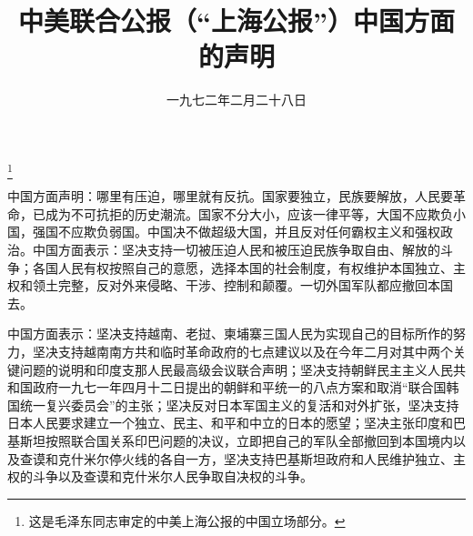 
\title{中美联合公报（“上海公报”）中国方面的声明}
\date{一九七二年二月二十八日}
\thanks{这是毛泽东同志审定的中美上海公报的中国立场部分。}
\maketitle


中国方面声明：哪里有压迫，哪里就有反抗。国家要独立，民族要解放，人民要革命，已成为不可抗拒的历史潮流。国家不分大小，应该一律平等，大国不应欺负小国，强国不应欺负弱国。中国决不做超级大国，并且反对任何霸权主义和强权政治。中国方面表示：坚决支持一切被压迫人民和被压迫民族争取自由、解放的斗争；各国人民有权按照自己的意愿，选择本国的社会制度，有权维护本国独立、主权和领土完整，反对外来侵略、干涉、控制和颠覆。一切外国军队都应撤回本国去。

中国方面表示：坚决支持越南、老挝、柬埔寨三国人民为实现自己的目标所作的努力，坚决支持越南南方共和临时革命政府的七点建议以及在今年二月对其中两个关键问题的说明和印度支那人民最高级会议联合声明；坚决支持朝鲜民主主义人民共和国政府一九七一年四月十二日提出的朝鲜和平统一的八点方案和取消“联合国韩国统一复兴委员会”的主张；坚决反对日本军国主义的复活和对外扩张，坚决支持日本人民要求建立一个独立、民主、和平和中立的日本的愿望；坚决主张印度和巴基斯坦按照联合国关系印巴问题的决议，立即把自己的军队全部撤回到本国境内以及查谟和克什米尔停火线的各自一方，坚决支持巴基斯坦政府和人民维护独立、主权的斗争以及查谟和克什米尔人民争取自决权的斗争。

